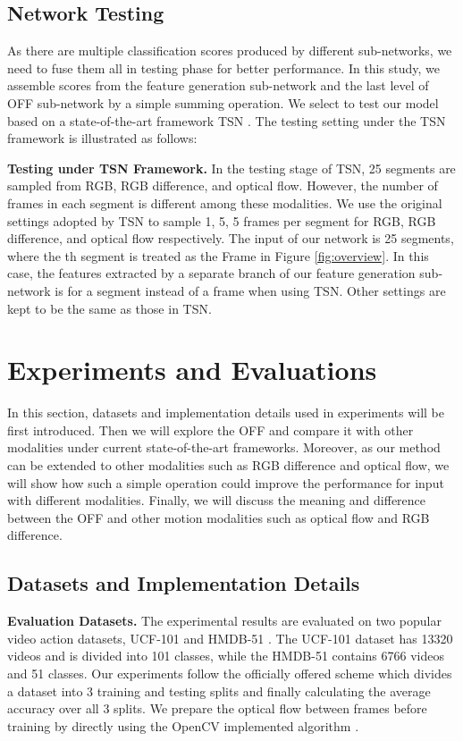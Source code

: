 \documentclass[10pt,twocolumn,letterpaper]{article}
\begin{document}
\subsection{Network Testing}



As there are multiple classification scores produced by different sub-networks, we need to fuse them all in testing phase for better performance. In this study, we  assemble scores from the feature generation sub-network and the last level of OFF sub-network by a simple summing operation. We select to test our model based on a state-of-the-art framework TSN \cite{wang2016tsn}. The testing setting under the TSN framework is illustrated as follows:





\textbf{Testing under TSN Framework.} 
In the testing stage of TSN, 25 segments are sampled from RGB, RGB difference, and optical flow. However, the number of frames in each segment is different among these modalities. We use the original settings adopted by TSN  to sample 1, 5, 5 frames per segment for RGB, RGB difference, and optical flow respectively. The input of our network is 25 segments, where the th segment is treated as the Frame  in Figure \ref{fig:overview}. In this case, the features extracted by a separate branch of our feature generation sub-network is for a segment instead of a frame when using TSN. Other settings are kept to be the same as those in TSN.

\vspace{-5px}
\section{Experiments and Evaluations}
\label{sec:experiment}
In this section, datasets and implementation details used in experiments will be first introduced. Then we will explore the OFF and compare it with other modalities under current state-of-the-art frameworks. Moreover, as our method can be extended to other modalities such as RGB difference and optical flow, we will show how such a simple operation could improve the performance for input with different modalities. Finally, we will discuss the meaning and difference between the OFF and other motion modalities such as optical flow and RGB difference.

\subsection{Datasets and Implementation Details}
\textbf{Evaluation Datasets.} The experimental results are evaluated on two popular video action datasets, UCF-101 \cite{khu2012ucf101} and HMDB-51 \cite{Kuehne11hmdb}. The UCF-101 dataset has 13320 videos and is divided into 101 classes, while the HMDB-51 contains 6766 videos and 51 classes. Our experiments follow the officially offered scheme which divides a dataset into 3 training and testing splits and finally calculating the average accuracy over all 3 splits. We prepare the optical flow between frames before training by directly using the OpenCV implemented algorithm \cite{zach2007tvl1}.
\end{document}
